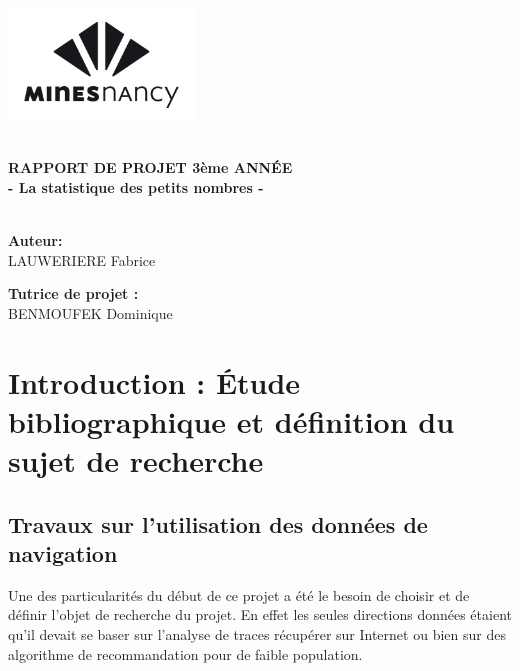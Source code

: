 \documentclass[a4paper, 11pt]{article}
\begin{document}

\begin{titlepage}
\includegraphics[width=5cm]{images/logo_mines.jpg}
\vspace{6cm}
\begin{center}
\hrulefill\\
{\LARGE \textbf{RAPPORT DE PROJET 3ème ANNÉE\\ - La statistique des petits nombres -\\}}
\hrulefill\\
\vspace{1cm}
\vspace{2cm}

\begin{minipage}{5cm}
\begin{center}
\textbf{Auteur:}\\
LAUWERIERE Fabrice
\end{center}
\end{minipage}
\hspace{1cm}
\begin{minipage}{5cm}
\begin{center}
\textbf{Tutrice de projet :}\\
BENMOUFEK Dominique
\end{center}
\end{minipage}
\end{center}
\end{titlepage} 

\tableofcontents
\pagestyle{headings}
\newpage

\section{Introduction : Étude bibliographique et définition du sujet de recherche}

\subsection{Travaux sur l'utilisation des données de navigation}
Une des particularités du début de ce projet a été le besoin de choisir et de définir l'objet de recherche du projet. En effet les seules directions données étaient qu'il devait se baser sur l'analyse de traces récupérer sur Internet ou bien sur des algorithme de recommandation pour de faible population.
\end{document}

